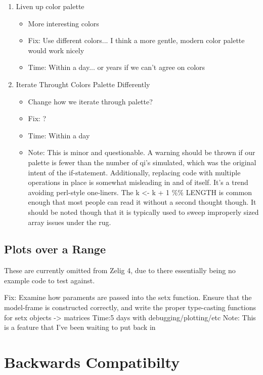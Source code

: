 \documentclass{article}
\begin{document}
\begin{enumerate}
  \item Liven up color palette \begin{itemize}
      \item More interesting colors
      \item Fix: Use different colors... I think a more gentle, modern color palette would work nicely
      \item Time: Within a day... or years if we can't agree on colors
    \end{itemize}

  \item Iterate Throught Colors Palette Differently \begin{itemize}
      \item Change how we iterate through palette?
      \item Fix: ?
      \item Time: Within a day
      \item Note: This is minor and questionable. A warning should be thrown if our palette is fewer than the number of qi's simulated, which was the original intent of the if-statement. Additionally, 
        replacing code with multiple operations in place is somewhat misleading in and of itself. It's a trend avoiding perl-style one-liners. The k <- k + 1 \%\% LENGTH is common enough that most people
        can read it without a second thought though. It should be noted though that it is typically used to sweep improperly sized array issues under the rug.
    \end{itemize}
\end{enumerate}

\subsection{Plots over a Range}

These are currently omitted from Zelig 4, due to there essentially being no example code to test against.

Fix: Examine how paraments are passed into the setx function. Ensure that the model-frame is constructed correctly, and write the proper type-casting functions for setx objects -> matrices
Time:5 days with debugging/plotting/etc
Note: This is a feature that I've been waiting to put back in

\section{Backwards Compatibilty}
\end{document}
